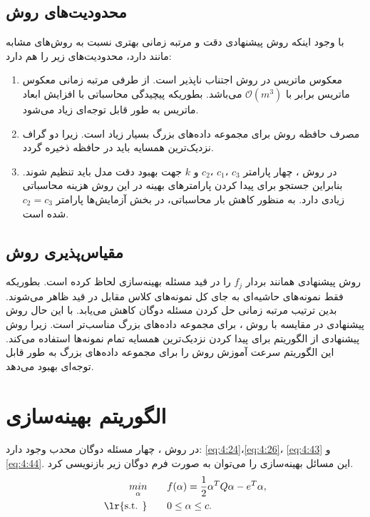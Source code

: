 \subsection{محدودیت‌های روش }\label{sec:4:6:3}
با وجود اینکه روش پیشنهادی دقت و مرتبه زمانی بهتری نسبت به روش‌های مشابه مانند  دارد، محدودیت‌های زیر را هم دارد:
\begin{enumerate}
	\item معکوس ماتریس در روش  اجتناب ناپذیر است. از طرفی مرتبه زمانی معکوس ماتریس برابر با  $\mathcal{O}(m^{3})$ می‌باشد. بطوریکه پیچیدگی محاسباتی با افزایش ابعاد ماتریس به طور قابل توجه‌ای زیاد می‌شود.
	\item مصرف حافظه روش  برای مجموعه داده‌های بزرگ بسیار زیاد است. زیرا دو گراف نزدیک‌ترین همسایه باید در حافظه ذخیره گردد.
	\item در روش ، چهار پارامتر $c_{3}$ ،$c_{1}$  ،$c_{2}$   و  $k$ جهت بهبود دقت مدل باید تنظیم شوند. بنابراین جستجو برای پیدا کردن پارامترهای بهینه در این روش هزینه محاسباتی زیادی دارد. به منظور کاهش بار محاسباتی، در بخش آزمایش‌ها پارامتر $c_{2} = c_{3}$  شده است.
\end{enumerate}

\subsection{مقیاس‌پذیری روش }\label{sec:4:6:4}
روش پیشنهادی همانند  بردار  $f_{j}$ را در قید مسئله بهینه‌سازی لحاظ کرده است. بطوریکه فقط نمونه‌های حاشیه‌ای به جای کل نمونه‌های کلاس مقابل در قید ظاهر می‌شوند. بدین ترتیب مرتبه زمانی حل کردن مسئله دوگان کاهش می‌یابد. با این حال روش پیشنهادی در مقایسه با روش ، برای مجموعه داده‌های بزرگ مناسب‌تر است. زیرا روش پیشنهادی از الگوریتم  برای پیدا کردن نزدیک‌ترین همسایه تمام نمونه‌ها استفاده می‌کند. این الگوریتم سرعت آموزش روش  را برای مجموعه داده‌های بزرگ به طور قابل توجه‌ای بهبود می‌دهد.

\section{الگوریتم بهینه‌سازی }\label{sec:4:7}
در روش ، چهار مسئله دوگان محدب وجود دارد: \ref{eq:4:24}،\ref{eq:4:26}، \ref{eq:4:43} و \ref{eq:4:44}. این مسائل بهینه‌سازی را می‌توان به صورت فرم دوگان زیر بازنویسی کرد.
\begin{equation}\label{eq:4:47}
\begin{split}
\mathop{{ min}}\limits_{\alpha} \qquad & f(\alpha)=\frac{1}{2} \alpha^{T}Q\alpha - e^{T}\alpha, \\
\textrm{\lr{s.t. }} \qquad & 0 \leq \alpha \leq c.
\end{split}
\end{equation}


